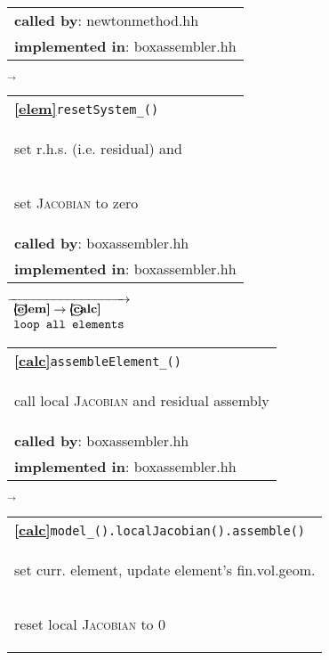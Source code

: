 \begin{landscape}
{\begin{tabular}{|l|}
      \textbf{called by}: newtonmethod.hh\\
      \textbf{implemented in}: boxassembler.hh\\  
	\hline
  \end{tabular}
    \nextline
    $\overrightarrow{
    }$
    \begin{tabular}{|l|}
      \hline      
	\textbf{\textcircled{\ref{elem}}}\verb+resetSystem_()+ \\
    \begin{scriptsize} set r.h.s. (i.e. residual) and\end{scriptsize}\\
    \begin{scriptsize} set \textsc{Jacobian} to zero \end{scriptsize}\\
      \textbf{called by}: boxassembler.hh\\
      \textbf{implemented in}: boxassembler.hh\\  
	\hline
  \end{tabular}
    {\scriptsize$\overrightarrow{\begin{array}{l}
				  \textbf{\textcircled{\ref{elem}}}\rightarrow\textbf{\textcircled{\ref{calc}}}\\
				  \texttt{loop all elements}
                                \end{array}
    }$}
     \begin{tabular}{|l|}
      \hline
      \textbf{\textcircled{\ref{calc}}}\verb+assembleElement_()+ \\
      \begin{scriptsize}call local \textsc{Jacobian} and residual assembly\end{scriptsize}\\
      \textbf{called by}: boxassembler.hh\\
      \textbf{implemented in}: boxassembler.hh\\  
      \hline
     \end{tabular}
\nextline
    {\scriptsize$\overrightarrow{
        }$}
     \begin{tabular}{|l|}
      \hline
     \textbf{\textcircled{\ref{calc}}}\verb+model_().localJacobian().assemble()+ \\
     \begin{scriptsize}set curr. element, update element's fin.vol.geom.\end{scriptsize}\\
     \begin{scriptsize}reset local \textsc{Jacobian} to 0\end{scriptsize}\\

\end{tabular}}
\end{landscape}
